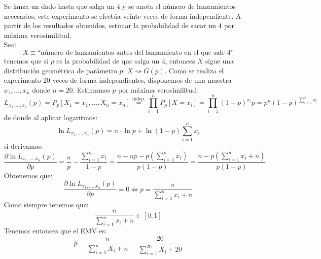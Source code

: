 \begin{ejercicio}\label{ej:5_rel5}
    Se lanza un dado hasta que salga un $4$ y se anota el número de lanzamientos necesarios; este experimento se efectúa veinte veces de forma independiente. A partir de los resultados obtenidos, estimar la probabilidad de sacar un $4$ por máxima verosimilitud.\\

    \noindent
    Sea:
    \begin{equation*}
        X \equiv \text{``número de lanzamientos antes del lanzamiento en el que sale 4''}
    \end{equation*}
    tenemos que si $p$ es la probabilidad de que salga un 4, entonces $X$ sigue una distribución geométrica de parámetro $p$: $X\rightsquigarrow G(p)$. Como se realiza el experimento 20 veces de forma independientes, disponemos de una muestra $x_1, \ldots, x_n$ donde $n=20$. Estimamos $p$ por máxima verosimilitud:
    \begin{equation*}
        L_{x_1,\ldots,x_{n}}(p) = P_p[X_1 =x_1, \ldots, X_n=x_n] \stackrel{\text{indep.}}{=} \prod_{i=1}^{n} P_p[X=x_i] = \prod_{i=1}^{n} {(1-p)}^{x_i}p = p^{n}{(1-p)}^{\sum\limits_{i=1}^{n}x_i}
    \end{equation*}
    de donde al aplicar logaritmos:
    \begin{equation*}
        \ln L_{x_1,\ldots,x_n}(p) = n\cdot \ln p + \ln(1-p)\sum_{i=1}^{n}x_i
    \end{equation*}
    si derivamos:
    \begin{equation*}
        \dfrac{\partial \ln L_{x_1,\ldots,x_n}(p)}{\partial p} = \frac{n}{p} - \frac{\sum\limits_{i=1}^{n}x_i}{1-p} = \frac{n - np - p\left(\sum\limits_{i=1}^{n}x_i\right)}{p(1-p)} = \frac{n - p\left(\sum\limits_{i=1}^{n}x_i +n\right)}{p(1-p)}
    \end{equation*}
    Obtenemos que:
    \begin{equation*}
        \dfrac{\partial \ln L_{x_1,\ldots,x_n}(p)}{\partial  p} = 0 \Longleftrightarrow p = \frac{n}{\sum\limits_{i=1}^{n}x_i + n}
    \end{equation*}
    Como siempre tenemos que:
    \begin{equation*}
        \frac{n}{\sum\limits_{i=1}^{n}x_i + n} \in [0,1] 
    \end{equation*}
    Tenemos entonces que el EMV es:
    \begin{equation*}
        \hat{p} = \frac{n}{\sum\limits_{i=1}^{n}X_i+n} = \frac{20}{\sum\limits_{i=1}^{20}X_i+20}
    \end{equation*}
\end{ejercicio}

